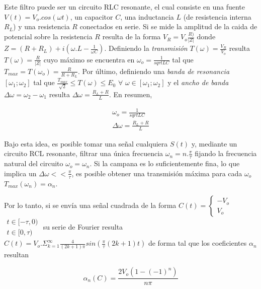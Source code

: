 \documentclass[11pt,a4paper]{article}
\begin{document}
Este filtro puede ser un circuito RLC resonante, el cual consiste en una fuente $V(t) = V_o.cos(\omega t)$, un capacitor $C$, una inductancia $L$ (de resistencia interna $R_L$) y una resistencia $R$ conectados en serie. Si se mide la amplitud de la caida de potencial sobre la resistencia $R$ resulta de la forma $V_R = V_o\frac{R)}{|Z|}$ donde $Z = (R+R_L)+i(\omega.L-\frac{1}{\omega C})$. Definiendo la \textit{transmisión} $T(\omega) = \frac{V_R}{V_o}$ resulta $T(\omega) = \frac{R}{|Z|}$ cuyo máximo se encuentra en $\omega_o = \frac{1}{sqrt{LC}}$ tal que $T_{max} = T(\omega_o) = \frac{R}{R+R_L}$. Por último, definiendo una \textit{banda de resonancia} $[\omega_1;\omega_2]$ tal que $\frac{T_{max}}{\sqrt{2}} \leq T(\omega) \leq E_{0}$ $\forall$ $\omega \in [\omega_1;\omega_2]$ y el \textit{ancho de banda} $\Delta\omega = \omega_2 - \omega_1$ resulta $\Delta\omega = \frac{R_L+R}{L}$. En resumen,

\begin{equation}
\begin{split}
\omega_o = \frac{1}{sqrt{LC}}\\
\Delta\omega = \frac{R_L+R}{L}
\end{split}
\label{eq:resonante}
\end{equation}

Bajo esta idea, es posible tomar una señal cualquiera $S(t)$ y, mediante un circuito RCL resonante, filtrar una única frecuencia $\omega_n = n.\frac{\pi}{\tau}$ fijando la frecuencia natural del circuito $\omega_o = \omega_n$. Si la campana es lo suficientemente fina, lo que implica un $\Delta \omega << \frac{\pi}{\tau}$, es posible obtener una transmisión máxima para cada $\omega_o$ $T_{max}(\omega_n) = \alpha_n$.

Por lo tanto, si se envía una señal cuadrada de la forma $C(t)=
\left\{\begin{matrix}
-V_o \\ V_o
\end{matrix}\right.$
$\begin{matrix}
t\in[-\tau,0)\\ t\in[0,\tau)
\end{matrix}$
su serie de Fourier resulta $C(t) = V_o.\Sigma_{k=1}^{\infty} \frac{4}{(2k+1)\pi}sin(\frac{\pi}{\tau}(2k+1)t)$ de forma tal que los coeficientes $\alpha_n$ resultan

\begin{equation}
\alpha_n(C) = \frac{2V_o(1-(-1)^n)}{n\pi}
\label{eq:coef_cuad}
\end{equation}
\end{document}
